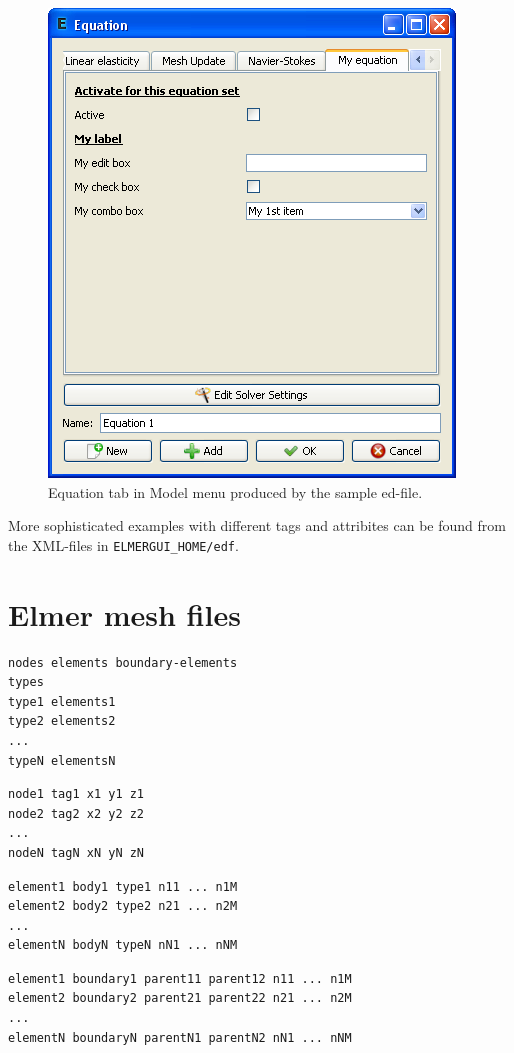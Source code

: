 \documentclass[a4paper,12pt]{article}
\begin{document}
\begin{figure}[ht]
\begin{center}
 \includegraphics[scale=0.5]{images/edfsample.png}
\caption{Equation tab in Model menu produced by the sample ed-file.}
\end{center}
\end{figure}

More sophisticated examples with different tags and attribites can be found from the XML-files in  {\tt ELMERGUI\_HOME/edf}.

\newpage

\section{Elmer mesh files}

\begin{verbatim}
nodes elements boundary-elements
types
type1 elements1
type2 elements2
...
typeN elementsN
\end{verbatim}

\vskip5mm

\begin{verbatim}
node1 tag1 x1 y1 z1
node2 tag2 x2 y2 z2
...
nodeN tagN xN yN zN
\end{verbatim}

\vskip5mm

\begin{verbatim}
element1 body1 type1 n11 ... n1M
element2 body2 type2 n21 ... n2M
...
elementN bodyN typeN nN1 ... nNM
\end{verbatim}

\vskip5mm

\begin{verbatim}
element1 boundary1 parent11 parent12 n11 ... n1M
element2 boundary2 parent21 parent22 n21 ... n2M
...
elementN boundaryN parentN1 parentN2 nN1 ... nNM
\end{verbatim}
\end{document}
